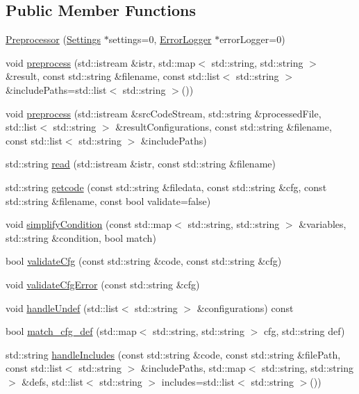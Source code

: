 \subsection*{Public Member Functions}
\begin{DoxyCompactItemize}
\item 
\hyperlink{class_preprocessor_af3677b58c4424b602cb706c62d832924}{Preprocessor} (\hyperlink{class_settings}{Settings} $\ast$settings=0, \hyperlink{class_error_logger}{Error\-Logger} $\ast$error\-Logger=0)
\item 
void \hyperlink{class_preprocessor_a90bef0b0532bec9f260b6dc7ac0cf815}{preprocess} (std\-::istream \&istr, std\-::map$<$ std\-::string, std\-::string $>$ \&result, const std\-::string \&filename, const std\-::list$<$ std\-::string $>$ \&include\-Paths=std\-::list$<$ std\-::string $>$())
\item 
void \hyperlink{class_preprocessor_a897596b1fc45bb6e0723dd71db7fc115}{preprocess} (std\-::istream \&src\-Code\-Stream, std\-::string \&processed\-File, std\-::list$<$ std\-::string $>$ \&result\-Configurations, const std\-::string \&filename, const std\-::list$<$ std\-::string $>$ \&include\-Paths)
\item 
std\-::string \hyperlink{class_preprocessor_a90807d3b28a015d64483e4868a82f681}{read} (std\-::istream \&istr, const std\-::string \&filename)
\item 
std\-::string \hyperlink{class_preprocessor_a3e7df26cd29f3686c1f17bb1fdb360b9}{getcode} (const std\-::string \&filedata, const std\-::string \&cfg, const std\-::string \&filename, const bool validate=false)
\item 
void \hyperlink{class_preprocessor_aa5be09306356080332803e3af101b2cf}{simplify\-Condition} (const std\-::map$<$ std\-::string, std\-::string $>$ \&variables, std\-::string \&condition, bool match)
\item 
bool \hyperlink{class_preprocessor_afa35c697e0534604c9de5ef0427828d9}{validate\-Cfg} (const std\-::string \&code, const std\-::string \&cfg)
\item 
void \hyperlink{class_preprocessor_ad9a3c04f3bd936643a1f94c647d8fa69}{validate\-Cfg\-Error} (const std\-::string \&cfg)
\item 
void \hyperlink{class_preprocessor_a79491dc06c5124eca1c4196c38dc6b22}{handle\-Undef} (std\-::list$<$ std\-::string $>$ \&configurations) const 
\item 
bool \hyperlink{class_preprocessor_a0fe9b410c441c84857573c39b017aa6b}{match\-\_\-cfg\-\_\-def} (std\-::map$<$ std\-::string, std\-::string $>$ cfg, std\-::string def)
\item 
std\-::string \hyperlink{class_preprocessor_a144622a7bd17a53996cd294614cc448c}{handle\-Includes} (const std\-::string \&code, const std\-::string \&file\-Path, const std\-::list$<$ std\-::string $>$ \&include\-Paths, std\-::map$<$ std\-::string, std\-::string $>$ \&defs, std\-::list$<$ std\-::string $>$ includes=std\-::list$<$ std\-::string $>$())
\end{DoxyCompactItemize}
